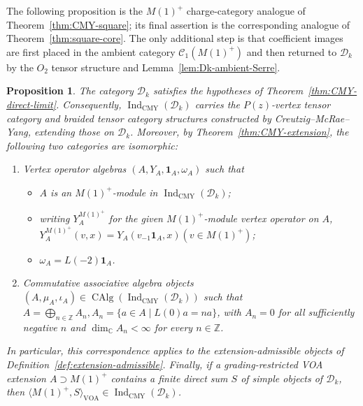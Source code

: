 \documentclass[12pt,leqno]{amsart}
\numberwithin{equation}{section} \newtheorem{thm}{Theorem}[section] \newtheorem{lem}[thm]{Lemma} \newtheorem{ex}[thm]{Example} \newtheorem{prop}[thm]{Proposition} \newtheorem{cor}[thm]{Corollary} \newtheorem{defi}[thm]{Definition} \newtheorem{rmk}[thm]{Remark} \newtheorem{notation}[thm]{Notation}
\newcommand{\one}{\mathbf{1}}
\newcommand{\Dk}{\mathcal D_k}
\newcommand{\CAlg}{\operatorname{CAlg}}
\newcommand{\IndCMY}{\operatorname{Ind}_{\mathrm{CMY}}}
\def\Z{\mathbb{Z}} \def\N{\mathbb{N}} \def\A{\mathbb{A}} \def\C{\mathbb{C}} \def\R{\mathbb{R}} \def\Q{\mathbb{Q}} \def\F{\mathbb{F}}
\begin{document}
The following proposition is the $M(1)^+$ charge-category analogue of Theorem~\ref{thm:CMY-square}; its final assertion is the corresponding analogue of Theorem~\ref{thm:square-core}. The only additional step is that coefficient images are first placed in the ambient category $\mathcal C_1(M(1)^+)$ and then returned to $\Dk$ by the $O_2$ tensor structure and Lemma~\ref{lem:Dk-ambient-Serre}.

\begin{prop}\label{prop:CMY-O2}
The category $\Dk$ satisfies the hypotheses of Theorem~\ref{thm:CMY-direct-limit}. Consequently, $\IndCMY(\Dk)$ carries the $P(z)$-vertex tensor category and braided tensor category structures constructed by Creutzig--McRae--Yang, extending those on $\Dk$. Moreover, by Theorem~\ref{thm:CMY-extension}, the following two categories are isomorphic:
\begin{enumerate}[label=\textnormal{(\arabic*)}]
\item Vertex operator algebras $(A,Y_A,\one_A,\omega_A)$ such that
\begin{itemize}
\item $A$ is an $M(1)^+$-module in $\IndCMY(\Dk)$;
\item writing $Y_A^{M(1)^+}$ for the given $M(1)^+$-module vertex
operator on $A$, \(Y_A^{M(1)^+}(v,x)=Y_A(v_{-1}\one_A,x)(v\in M(1)^+)\);
\item $\omega_A=L(-2)\one_A$.
\end{itemize}

\item Commutative associative algebra objects
$(A,\mu_A,\iota_A)\in\CAlg(\IndCMY(\Dk))$ such that \(A=\bigoplus_{n\in\Z}A_n,A_n=\{a\in A\mid L(0)a=na\}\), with $A_n=0$ for all sufficiently negative $n$ and $\dim_\C A_n<\infty$ for every $n\in\Z$.
\end{enumerate}
In particular, this correspondence applies to the extension-admissible objects of Definition~\ref{def:extension-admissible}. Finally, if a grading-restricted VOA extension $A\supset M(1)^+$ contains a finite direct sum $S$ of simple objects of $\Dk$, then \(\langle M(1)^+,S\rangle_{\mathrm{VOA}}\in\IndCMY(\Dk)\).
\end{prop}
\end{document}
